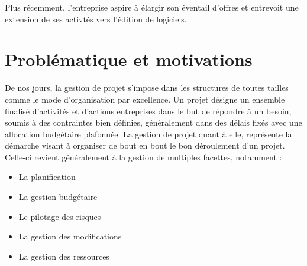 \begin{spacing}{1.5}
Plus récemment, l'entreprise aspire à élargir son éventail d'offres et entrevoit une extension de ses activtés vers l'édition de logiciels.


\section{Problématique et motivations}
De nos jours, la gestion de projet s'impose dans les structures de toutes tailles comme le mode d'organisation par excellence. Un projet désigne un ensemble finalisé d'activités et d'actions entreprises dans le but de répondre à un besoin, soumis à des contraintes bien définies, généralement dans des délais fixés avec une allocation budgétaire plafonnée. La gestion de projet quant à elle, représente la démarche visant à organiser de bout en bout le bon déroulement d'un projet.\\
Celle-ci revient généralement à la gestion de multiples facettes, notamment :
\begin{itemize}
\item La planification
    \item La gestion budgétaire
    \item Le pilotage des risques
    \item La gestion des modifications
    \item La gestion des ressources
\end{itemize}
\


\end{spacing}
